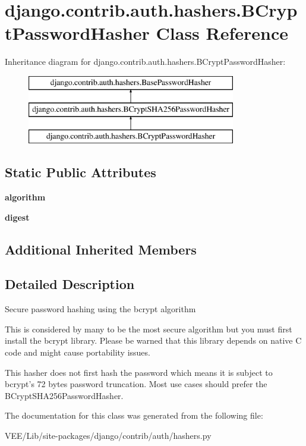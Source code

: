 \hypertarget{classdjango_1_1contrib_1_1auth_1_1hashers_1_1_b_crypt_password_hasher}{}\section{django.\+contrib.\+auth.\+hashers.\+B\+Crypt\+Password\+Hasher Class Reference}
\label{classdjango_1_1contrib_1_1auth_1_1hashers_1_1_b_crypt_password_hasher}
Inheritance diagram for django.\+contrib.\+auth.\+hashers.\+B\+Crypt\+Password\+Hasher\+:\begin{figure}[H]
\begin{center}
\leavevmode
\includegraphics[height=3.000000cm]{classdjango_1_1contrib_1_1auth_1_1hashers_1_1_b_crypt_password_hasher}
\end{center}
\end{figure}
\subsection*{Static Public Attributes}
\begin{DoxyCompactItemize}
\item 
\mbox{\label{classdjango_1_1contrib_1_1auth_1_1hashers_1_1_b_crypt_password_hasher_a156f1a6b0693b258b5429a10df9f916a}} 
{\bfseries algorithm}
\item 
\mbox{\label{classdjango_1_1contrib_1_1auth_1_1hashers_1_1_b_crypt_password_hasher_a1a45078094a18bee21452628cbf3fce3}} 
{\bfseries digest}
\end{DoxyCompactItemize}
\subsection*{Additional Inherited Members}


\subsection{Detailed Description}
\begin{DoxyVerb}Secure password hashing using the bcrypt algorithm

This is considered by many to be the most secure algorithm but you
must first install the bcrypt library.  Please be warned that
this library depends on native C code and might cause portability
issues.

This hasher does not first hash the password which means it is subject to
bcrypt's 72 bytes password truncation. Most use cases should prefer the
BCryptSHA256PasswordHasher.
\end{DoxyVerb}
 

The documentation for this class was generated from the following file\+:\begin{DoxyCompactItemize}
\item 
V\+E\+E/\+Lib/site-\/packages/django/contrib/auth/hashers.\+py\end{DoxyCompactItemize}
